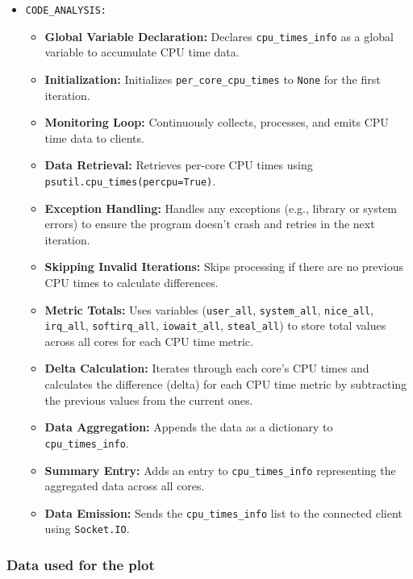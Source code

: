 \documentclass[12pt]{article}
\begin{document}
\begin{itemize}
        \item \texttt{CODE\_ANALYSIS:}
        \begin{itemize}
            \item \textbf{Global Variable Declaration:} Declares \texttt{cpu\_times\_info} as a global variable to accumulate CPU time data.
            \item \textbf{Initialization:} Initializes \texttt{per\_core\_cpu\_times} to \texttt{None} for the first iteration.
            \item \textbf{Monitoring Loop:} Continuously collects, processes, and emits CPU time data to clients.
            \item \textbf{Data Retrieval:} Retrieves per-core CPU times using \texttt{psutil.cpu\_times(percpu=True)}.
            \item \textbf{Exception Handling:} Handles any exceptions (e.g., library or system errors) to ensure the program doesn't crash and retries in the next iteration.
            \item \textbf{Skipping Invalid Iterations:} Skips processing if there are no previous CPU times to calculate differences.
            \item \textbf{Metric Totals:} Uses variables (\texttt{user\_all}, \texttt{system\_all}, \texttt{nice\_all}, \texttt{irq\_all}, \texttt{softirq\_all}, \texttt{iowait\_all}, \texttt{steal\_all}) to store total values across all cores for each CPU time metric.
            \item \textbf{Delta Calculation:} Iterates through each core's CPU times and calculates the difference (delta) for each CPU time metric by subtracting the previous values from the current ones.
            \item \textbf{Data Aggregation:} Appends the data as a dictionary to \texttt{cpu\_times\_info}.
            \item \textbf{Summary Entry:} Adds an entry to \texttt{cpu\_times\_info} representing the aggregated data across all cores.
            \item \textbf{Data Emission:} Sends the \texttt{cpu\_times\_info} list to the connected client using \texttt{Socket.IO}.
        \end{itemize}
    \end{itemize}
\subsubsection{Data used for the plot}
\end{document}
